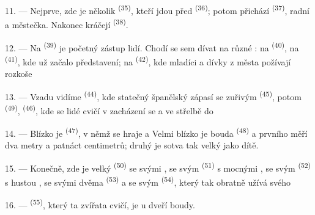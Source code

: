 11. --- Nejprve, zde je několik  \textsuperscript{(35)}, kteří jdou před
 \textsuperscript{(36)}; potom přichází 
\textsuperscript{(37)}, radní a  městečka. Nakonec
kráčejí  \textsuperscript{(38)}.

\VUsaut{5.0mm}
\VUsaut{3.6mm}

12. --- Na  \textsuperscript{(39)} je početný zástup
lidí. Chodí se sem dívat na různé : na 
\textsuperscript{(40)}, na  \textsuperscript{(41)}, kde už začalo
představení; na  \textsuperscript{(42)}, kde mladíci a dívky z
města požívají rozkoše 

13. --- Vzadu vidíme  \textsuperscript{(44)}, kde statečný španělský
 zápasí se zuřivým  \textsuperscript{(45)}, potom
 \textsuperscript{(49)}, 
\textsuperscript{(46)}, kde se lidé cvičí v zacházení se  a
ve střelbě do 

14. --- Blízko je  \textsuperscript{(47)}, v němž se hraje
 a  Velmi blízko je bouda 
\textsuperscript{(48)} a   prvního měří dva metry
a patnáct centimetrů; druhý je sotva tak velký jako dítě.

15. --- Konečně, zde je velký  \textsuperscript{(50)} se svými
, se svým  \textsuperscript{(51)} s mocnými
, se svým  \textsuperscript{(52)} s hustou ,
se svými dvěma  \textsuperscript{(53)} a se svým 
\textsuperscript{(54)}, který tak obratně užívá svého 

16. ---  \textsuperscript{(55)}, který ta zvířata cvičí, je u dveří
boudy.
